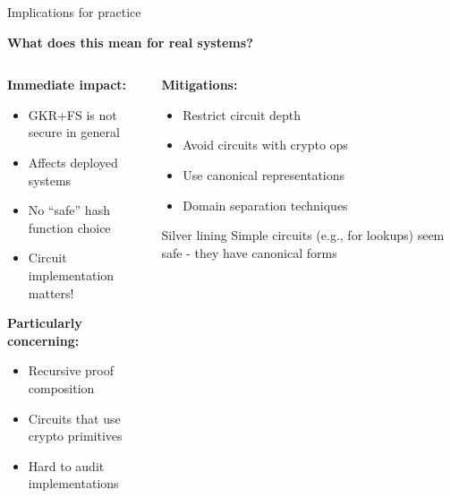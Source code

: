 \documentclass[aspectratio=169, lualatex, handout]{beamer}
\begin{document}
\begin{frame}{Implications for practice}
	\begin{center}
		\textbf{What does this mean for real systems?}
	\end{center}
	\vspace{0.5em}
	\begin{columns}[c]
		\begin{column}{0.5\textwidth}
			\textbf{Immediate impact:}
			\begin{itemize}
				\item GKR+FS is not secure in general
				\item Affects deployed systems
				\item No ``safe'' hash function choice
				\item Circuit implementation matters!
			\end{itemize}
			\vspace{0.5em}
			\textbf{Particularly concerning:}
			\begin{itemize}
				\item Recursive proof composition
				\item Circuits that use crypto primitives
				\item Hard to audit implementations
			\end{itemize}
		\end{column}
		\begin{column}{0.5\textwidth}
			\textbf{Mitigations:}
			\begin{itemize}
				\item Restrict circuit depth
				\item Avoid circuits with crypto ops
				\item Use canonical representations
				\item Domain separation techniques
			\end{itemize}
			\vspace{0.5em}
			\begin{exampleblock}{Silver lining}
				Simple circuits (e.g., for lookups) seem safe - they have canonical forms
			\end{exampleblock}
		\end{column}
	\end{columns}
\end{frame}
\end{document}

